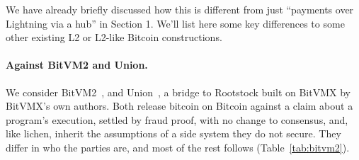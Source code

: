 \documentclass[11pt]{article}
\begin{document}
We have already briefly discussed how this is different from just ``payments over Lightning via a hub'' in Section 1. We'll list here some key differences to some other existing L2 or L2-like Bitcoin constructions.

\paragraph{Against BitVM2 and Union.} We consider BitVM2~\cite{bitvm2usenix}, and
Union~\cite{union}, a bridge to Rootstock built on BitVMX by BitVMX's
own authors. Both release bitcoin on Bitcoin against a claim about
a program's execution, settled by fraud proof, with no change to
consensus, and, like lichen, inherit the assumptions of a side system they
do not secure. They differ in who the parties are, and most of the rest
follows (Table~\ref{tab:bitvm2}).
\end{document}
